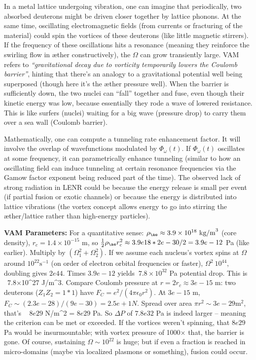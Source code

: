 \documentclass[a4paper, aps,preprint,superscriptaddress, 12pt]{revtex4}
\begin{document}
In a metal lattice undergoing vibration, one can imagine that periodically, two absorbed deuterons might be driven closer together by lattice phonons. At the same time, oscillating electromagnetic fields (from currents or fracturing of the material) could spin the vortices of these deuterons (like little magnetic stirrers). If the frequency of these oscillations hits a resonance (meaning they reinforce the swirling flow in æther constructively), the $\Omega$ can grow transiently large. VAM refers to \textit{“gravitational decay due to vorticity temporarily lowers the Coulomb barrier”}, hinting that there’s an analogy to a gravitational potential well being superposed (though here it’s the æther pressure well). When the barrier is sufficiently down, the two nuclei can “fall” together and fuse, even though their kinetic energy was low, because essentially they rode a wave of lowered resistance. This is like surfers (nuclei) waiting for a big wave (pressure drop) to carry them over a sea wall (Coulomb barrier).


Mathematically, one can compute a tunneling rate enhancement factor. It will involve the overlap of wavefunctions modulated by $\Phi_\omega(t)$. If $\Phi_\omega(t)$ oscillates at some frequency, it can parametrically enhance tunneling (similar to how an oscillating field can induce tunneling at certain resonance frequencies via the Gamow factor exponent being reduced part of the time). The observed lack of strong radiation in LENR could be because the energy release is small per event (if partial fusion or exotic channels) or because the energy is distributed into lattice vibrations (the vortex concept allows energy to go into stirring the æther/lattice rather than high-energy particles).


\textbf{VAM Parameters:} For a quantitative sense: $\rho_{\ae}\approx3.9\times10^{18}~\text{kg/m}^3$ (core density), $r_c=1.4\times10^{-15}$ m, so $\frac{1}{2}\rho_{\ae}r_c^2 \approx 3.9e18 * 2e-30 /2 = 3.9e-12$ Pa (like earlier). Multiply by $(\Omega_1^2+\Omega_2^2)$. If we assume each nucleus’s vortex spins at $\Omega$ around $10^{22}\text{s}^{-1}$ (on order of electron orbital frequencies or faster), $\Omega^2 ~ 10^{44}$, doubling gives $2e44$. Times $3.9e-12$ yields $~7.8\times10^{32}$ Pa potential drop. This is ~7.8×10^27 J/m^3. Compare Coulomb pressure at $r=2r_c \approx3e-15$ m: two deuterons ($Z_1Z_2=1*1$) have $F_C = e^2/(4\pi\epsilon_0 r^2)$. At $3e-15$ m, $F_C\sim (2.3e-28)/ (9e-30) =2.5e+1 N$. Spread over area $\pi r^2 \sim 3e-29 \text{m}^2$, that’s ~ $8e29$ N/m^2 = $8e29$ Pa. So $\Delta P$ of $7.8e32$ Pa is indeed larger – meaning the criterion can be met or exceeded. If the vortices weren’t spinning, that $8e29$ Pa would be insurmountable; with vortex pressure of 1000× that, the barrier is gone. Of course, sustaining $\Omega \sim10^{22}$ is huge; but if even a fraction is reached in micro-domains (maybe via localized plasmons or something), fusion could occur.
\end{document}
